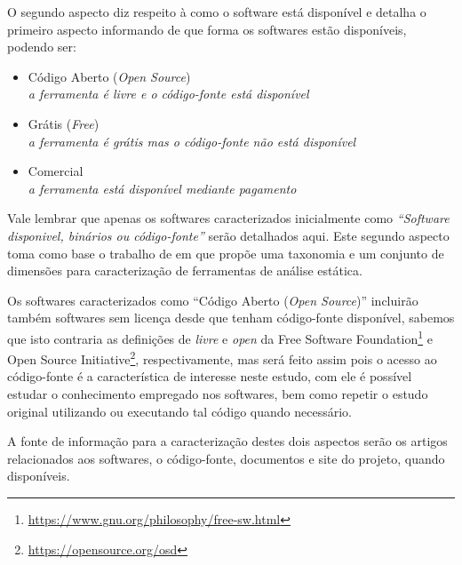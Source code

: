 O segundo aspecto diz respeito à como o software está disponível e detalha o
primeiro aspecto informando de que forma os softwares estão disponíveis, podendo
ser:

\begin{itemize}
  \item Código Aberto ({\it Open Source})\\
    {\it \small a ferramenta é livre e o código-fonte está disponível}
  \item Grátis ({\it Free})\\
    {\it \small a ferramenta é grátis mas o código-fonte não está disponível}
  \item Comercial\\
    {\it \small a ferramenta está disponível mediante pagamento}
\end{itemize}

Vale lembrar que apenas os softwares caracterizados inicialmente como
{\it``Software disponivel, binários ou código-fonte''} serão detalhados aqui.
Este segundo aspecto toma como base o trabalho de  em que
propõe uma taxonomia e um conjunto de dimensões para caracterização de
ferramentas de análise estática.

Os softwares caracterizados como ``Código Aberto ({\it Open Source})''
incluirão também softwares sem licença desde que tenham código-fonte
disponível, sabemos que isto contraria as definições de {\it livre} e
{\it open} da Free Software
Foundation\footnote{\url{https://www.gnu.org/philosophy/free-sw.html}} e Open
Source Initiative\footnote{\url{https://opensource.org/osd}}, respectivamente,
mas será feito assim pois o acesso ao código-fonte é a característica
de interesse neste estudo, com ele é possível estudar o
conhecimento empregado nos softwares, bem como repetir o estudo original
utilizando ou executando tal código quando necessário.

%
%

A fonte de informação para a caracterização destes dois aspectos serão os
artigos relacionados aos softwares, o código-fonte, documentos e site do
projeto, quando disponíveis.

